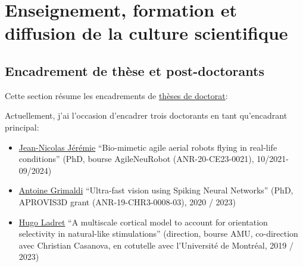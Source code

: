 \documentclass[10pt,french,a4paper,oneside]{article}%
\begin{document}
\section{Enseignement, formation et diffusion de la culture scientifique} %

\subsection{Encadrement de thèse et post-doctorants} %

%
%
Cette section résume les encadrements de \href{https://www.theses.fr/074493701}{thèses de doctorat}:

Actuellement, j'ai l'occasion d'encadrer trois doctorants %
en tant qu'encadrant principal:
\begin{itemize}
	\item \href{https://laurentperrinet.github.io/author/jean-nicolas-jeremie/}{Jean-Nicolas Jérémie} 	``Bio-mimetic agile aerial robots flying in real-life conditions'' (PhD, bourse AgileNeuRobot (ANR-20-CE23-0021), 10/2021-09/2024)
	\item \href{https://laurentperrinet.github.io/author/antoine-grimaldi/}{Antoine Grimaldi} ``Ultra-fast vision using Spiking Neural Networks'' (PhD, APROVIS3D grant (ANR-19-CHR3-0008-03), 2020 / 2023)
	\item \href{https://laurentperrinet.github.io/author/hugo-ladret/}{Hugo Ladret} ``A multiscale cortical model to account for orientation selectivity in natural-like stimulations''  (direction, bourse AMU, co-direction avec Christian Casanova, en cotutelle avec l'Université de Montréal, 2019 / 2023)
\end{itemize}

\end{document}
